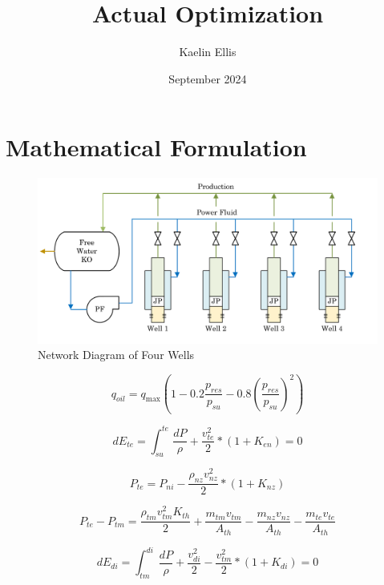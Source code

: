 \documentclass[12 pt]{report}
\title{Actual Optimization}
\author{Kaelin Ellis}
\date{September 2024}
\begin{document}
\section{Mathematical Formulation}

\begin{figure}
    \centering
    \includegraphics[width=1\linewidth]{figures/network_diagram.PNG}
    \caption{Network Diagram of Four Wells}
    \label{fig:jetpump_network_2}
\end{figure}

\begin{equation}
    q_{oil} = q_{\text{max}} \left( 1 - 0.2 \frac{p_{res}}{p_{su}} - 0.8 \left(\frac{p_{res}}{p_{su}}\right)^{2} \right)
\end{equation}

\begin{equation}
dE_{te} = \int_{su}^{te} \frac{dP}{\rho} + \frac{v_{te}^{2}}{2} * (1+K_{en}) = 0
\label{entr_intg}
\end{equation}

\begin{equation}
P_{te} = P_{ni} - \frac{\rho_{nz}v_{nz}^2}{2}*(1+K_{nz})
\label{nozz_pte}
\end{equation}

\begin{equation}
P_{te} - P_{tm} = \frac{\rho_{tm}v_{tm}^{2}K_{th}}{2} 
 + \frac{m_{tm}v_{tm}}{A_{th}} - \frac{m_{nz}v_{nz}}{A_{th}} - \frac{m_{te}v_{te}}{A_{th}}
\label{throat}
\end{equation}

\begin{equation}
dE_{di} = \int_{tm}^{di} \frac{dP}{\rho} + \frac{v_{di}^{2}}{2} - \frac{v_{tm}^{2}}{2} * (1+K_{di}) = 0
\label{diff_intg}
\end{equation}
\end{document}
